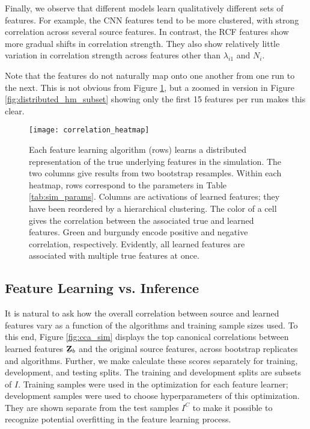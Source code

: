 Finally, we observe that different models learn qualitatively different sets of
features. For example, the CNN features tend to be more clustered, with strong
correlation across several source features. In contrast, the RCF features show
more gradual shifts in correlation strength. They also show relatively little
variation in correlation strength across features other than $\lambda_{i1}$ and
$N_{i}$.

Note that the features do not naturally map onto one another from one run to the
next. This is not obvious from Figure \ref{fig:distributed_hm}, but a zoomed in
version in Figure \ref{fig:distributed_hm_subset} showing only the first 15
features per run makes this clear.

\begin{figure}
  \centering
  \texttt{[image: correlation\_heatmap]}
  \caption{Each feature learning algorithm (rows) learns a distributed
    representation of the true underlying features in the simulation. The two
    columns give results from two bootstrap resamples. Within each heatmap, rows
    correspond to the parameters in Table \ref{tab:sim_params}. Columns are
    activations of learned features; they have been reordered by a hierarchical
    clustering. The color of a cell gives the correlation between the associated
    true and learned features. Green and burgundy encode positive and negative
    correlation, respectively. Evidently, all learned features are associated
    with multiple true features at once.}
  \label{fig:distributed_hm}
\end{figure}

\subsection{Feature Learning vs. Inference}

It is natural to ask how the overall correlation between source and learned
features vary as a function of the algorithms and training sample sizes used. To
this end, Figure \ref{fig:cca_sim} displays the top canonical correlations
between learned features $\underaccent{\bar}{\mathbf{Z}}_{b}$ and the original
source features, across bootstrap replicates and algorithms. Further, we make
calculate these scores separately for training, development, and testing splits.
The training and development splits are subsets of $I$. Training samples were
used in the optimization for each feature learner; development samples were used
to choose hyperparameters of this optimization. They are shown separate from the
test samples $I^{C}$ to make it possible to recognize potential overfitting in
the feature learning process.

